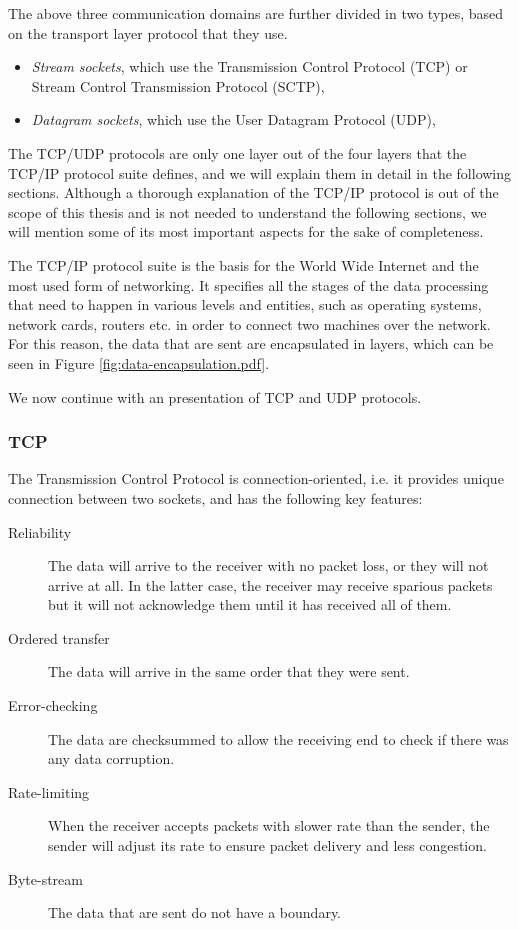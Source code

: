 The above three communication domains are further divided in two types, based 
on the transport layer protocol that they use.

\begin{itemize}
	\item \textit{Stream sockets}, which use the Transmission Control 
		Protocol (TCP) or Stream Control Transmission Protocol (SCTP),
	\item \textit{Datagram sockets}, which use the User Datagram Protocol 
		(UDP),
\end{itemize}

The TCP/UDP protocols are only one layer out of the four layers that the TCP/IP 
protocol suite defines, and we will explain them in detail in the following 
sections. Although a thorough explanation of the TCP/IP protocol is out of the 
scope of this thesis and is not needed to understand the following sections, we 
will mention some of its most important aspects for the sake of completeness.

The TCP/IP protocol suite is the basis for the World Wide Internet and the most 
used form of networking. It specifies all the stages of the data processing 
that need to happen in various levels and entities, such as operating systems, 
network cards, routers etc. in order to connect two machines over the network.  
For this reason, the data that are sent are encapsulated in layers, which can 
be seen in Figure \ref{fig:data-encapsulation.pdf}.


We now continue with an presentation of TCP and UDP protocols.

\subsubsection{TCP}

The Transmission Control Protocol is connection-oriented, i.e. it provides 
unique connection between two sockets, and has the following key features:

\begin{description}
	\item[Reliability] The data will arrive to the receiver with no packet 
		loss, or they will not arrive at all. In the latter case, the 
		receiver may receive sparious packets but it will not 
		acknowledge them until it has received all of them.
	\item[Ordered transfer] The data will arrive in the same order that 
		they were sent.
	\item[Error-checking] The data are checksummed to allow the receiving 
		end to check if there was any data corruption.
	\item[Rate-limiting] When the receiver accepts packets with slower rate 
		than the sender, the sender will adjust its rate to ensure 
		packet delivery and less congestion.
	\item[Byte-stream] The data that are sent do not have a boundary.
\end{description}

